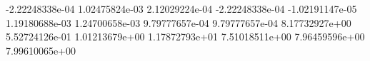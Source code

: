  -2.22248338e-04
 1.02475824e-03
 2.12029224e-04
 -2.22248338e-04
 -1.02191147e-05
 1.19180688e-03
 1.24700658e-03
 9.79777657e-04
 9.79777657e-04
 8.17732927e+00
 5.52724126e-01
 1.01213679e+00
 1.17872793e+01
 7.51018511e+00
 7.96459596e+00
 7.99610065e+00
